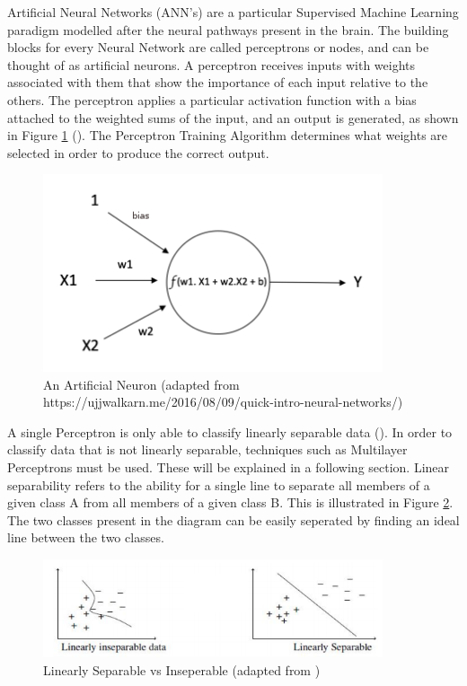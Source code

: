 \documentclass[12pt]{report}
\begin{document}
\begin{flushleft}
Artificial Neural Networks (ANN's) are a particular Supervised Machine Learning paradigm modelled after the neural pathways present in the brain. The building blocks for every Neural Network are called perceptrons or nodes, and can be thought of as artificial neurons. A perceptron receives inputs with weights associated with them that show the importance of each input relative to the others. The perceptron applies a particular activation function with a bias attached to the weighted sums of the input, and an output is generated, as shown in Figure \ref{fig:neuron} (\cite{geron2017hands}). The Perceptron Training Algorithm determines what weights are selected in order to produce the correct output.
\end{flushleft}

\vspace{0.5cm}
\begin{figure}[ht!]
	\centering
	\includegraphics[width=10cm]{neuron}
	\caption{An Artificial Neuron (adapted from https://ujjwalkarn.me/2016/08/09/quick-intro-neural-networks/)}
	\label{fig:neuron}
\end{figure}

\begin{flushleft}
A single Perceptron is only able to classify linearly separable data (\cite{kotsiantis2007supervised}). In order to classify data that is not linearly separable, techniques such as Multilayer Perceptrons must be used. These will be explained in a following section. Linear separability refers to the ability for a single line to separate all members of a given class A from all members of a given class B. This is illustrated in Figure \ref{fig:linear}. The two classes present in the diagram can be easily seperated by finding an ideal line between the two classes.
\end{flushleft}

\vspace{0.5cm}
\begin{figure}[ht!]
	\centering
	\includegraphics[width=10cm]{seperable}
	\caption{Linearly Separable vs Inseperable (adapted from \cite{mohamed2017comparative})}
	\label{fig:linear}
\end{figure}
\end{document}
